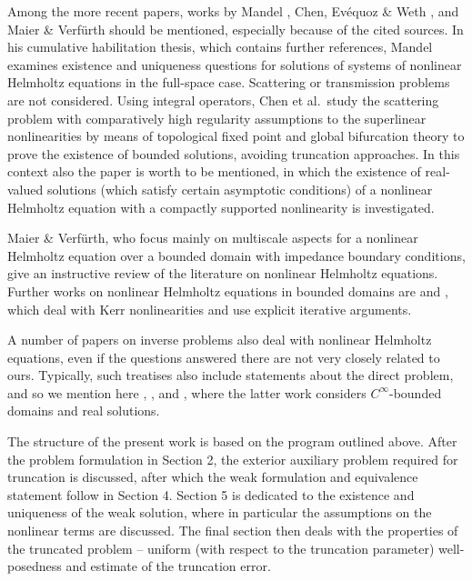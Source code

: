 \documentclass[12pt,DIV=14]{scrartcl}
\begin{document}
Among the more recent papers, works by Mandel \cite{Mandel:19},
Chen, Ev{\'{e}}quoz \& Weth \cite{Chen:21}, and Maier \& Verf\"{u}rth \cite{Maier:22}
should be mentioned, especially because of the cited sources.
In his cumulative habilitation thesis, which contains further references,
Mandel examines existence and uniqueness questions for solutions of systems
of nonlinear Helmholtz equations in the full-space case.
Scattering or transmission problems are not considered.
Using integral operators, Chen et al.\ study the scattering problem with
comparatively high regularity assumptions to the superlinear nonlinearities
by means of topological fixed point and global bifurcation theory
to prove the existence of bounded solutions,
avoiding truncation approaches.
In this context also the paper \cite{Evequoz:14} is worth to be mentioned, in which
the existence of real-valued solutions (which satisfy certain asymptotic conditions)
of a nonlinear Helmholtz equation with a compactly supported nonlinearity is investigated.

Maier \& Verf\"{u}rth, who focus mainly on multiscale aspects for a nonlinear Helmholtz equation
over a bounded domain with impedance boundary conditions,
give an instructive review of the literature on nonlinear Helmholtz equations.
Further works on nonlinear Helmholtz equations in bounded domains are \cite{Wu:18}
and \cite{Verfuerth:23}, which deal with Kerr nonlinearities and use explicit iterative arguments.

A number of papers on inverse problems also deal with nonlinear Helmholtz equations,
even if the questions answered there are not very closely related to ours.
Typically, such treatises also include statements about the direct problem,
and so we mention here \cite{Griesmaier:22}, \cite{Jalade:04}, and \cite{Harrach:23},
where the latter work considers $C^\infty$-bounded domains and real solutions.

The structure of the present work is based on the program outlined above.
After the problem formulation in Section 2, the exterior auxiliary problem
required for truncation is discussed, after which the weak formulation and
equivalence statement follow in Section 4. Section 5 is dedicated to
the existence and uniqueness of the weak solution, where in particular
the assumptions on the nonlinear terms are discussed.
The final section then deals with the properties of the truncated problem
-- uniform (with respect to the truncation parameter) well-posedness
and estimate of the truncation error.
\end{document}
